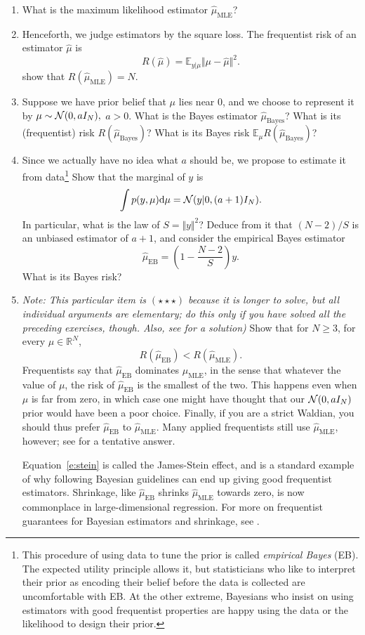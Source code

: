 \documentclass{article}
\begin{document}
\begin{enumerate}
\item What is the maximum likelihood estimator $\hat\mu_{\text{MLE}}$?
\item Henceforth, we judge estimators by the square loss. The frequentist risk of an estimator $\hat\mu$ is
 $$ R(\hat\mu) = \mathbb{E}_{y\vert\mu}  \Vert \mu - \hat\mu\Vert^2.$$
 show that $R(\hat\mu_{\text{MLE}}) = N$.
\item Suppose we have prior belief that $\mu$ lies near $0$, and we choose to represent it by $\mu\sim \mathcal{N}(0,aI_N),$ $a>0$. What is the Bayes estimator $\hat\mu_{\text{Bayes}}$? What is its (frequentist) risk $R(\hat\mu_{\text{Bayes}})$? What is its Bayes risk $\mathbb{E}_\mu R(\hat\mu_{\text{Bayes}})$?
\item Since we actually have no idea what $a$ should be, we propose to estimate it from data\footnote{This procedure of using data to tune the prior is called \emph{empirical Bayes} (EB). The expected utility principle allows it, but statisticians who like to interpret their prior as encoding their belief before the data is collected are uncomfortable with EB. At the other extreme, Bayesians who insist on using estimators with good frequentist properties are happy using the data or the likelihood to design their prior.} Show that the marginal of $y$ is
$$
\int p(y,\mu){\rm d} \mu = \mathcal{N} (y\vert 0,(a+1)I_N).
$$
In particular, what is the law of $S= \Vert y\Vert^2$? Deduce from it that $(N-2)/S$ is an unbiased estimator of $a+1$, and consider the empirical Bayes estimator $$\hat\mu_\text{EB} = \left(1- \frac{N-2}{S}\right)y.$$
What is its Bayes risk?
\item \emph{Note: This particular item is $(\star\star\star)$ because it is longer to solve, but all individual arguments are elementary; do this only if you have solved all the preceding exercises, though. Also, see \cite[Section 1.2]{Efr10} for a solution)} Show that for $N\geq 3$, for every $\mu\in\mathbb{R}^N$,
\begin{equation}
R(\hat\mu_\text{EB}) < R(\hat\mu_\text{MLE}).
\label{e:stein}
\end{equation}
Frequentists say that $\hat\mu_\text{EB}$ dominates $\mu_\text{MLE}$, in the sense that whatever the value of $\mu$, the risk of $\hat\mu_\text{EB}$ is the smallest of the two. This happens even when $\mu$ is far from zero, in which case one might have thought that our $\mathcal{N}(0,aI_N)$ prior would have been a poor choice. Finally, if you are a strict Waldian, you should thus prefer $\hat\mu_\text{EB}$ to $\hat\mu_\text{MLE}$. Many applied frequentists still use $\hat\mu_\text{MLE}$, however; see \citep[Section 1.3]{Efr10} for a tentative answer.

Equation~\ref{e:stein} is called the James-Stein effect, and is a standard example of why following Bayesian guidelines can end up giving good frequentist estimators. Shrinkage, like $\hat\mu_\text{EB}$ shrinks $\hat\mu_\text{MLE}$ towards zero, is now commonplace in large-dimensional regression. For more on frequentist guarantees for Bayesian estimators and shrinkage, see \citep[Sections 7, 8, 9]{PaIn09}.
\end{enumerate}
\end{document}
